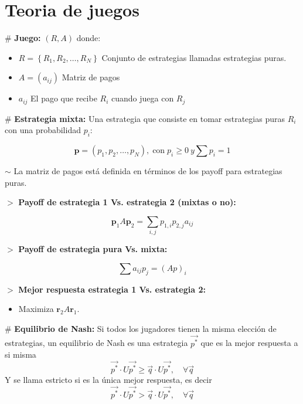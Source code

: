 \documentclass[%
 reprint,
 amsmath,amssymb,
 aps,
]{revtex4-1}
\begin{document}

\section{Teoria de juegos}

$\#$ \textbf{Juego:} $(R, A)$ donde:

\begin{itemize}
  \item[] 
  $R=\left\{R_{1}, R_{2}, \ldots, R_{N}\right\}$ Conjunto de estrategias llamadas estrategias puras. 
  \item[] 
  $A=\left(a_{i j}\right)$ Matriz de pagos
  \item[] 
  $a_{i j}$ El pago que recibe $R_i$ cuando juega con $R_j$
\end{itemize}

$\#$ \textbf{Estrategia mixta:} Una estrategia que consiste en tomar estrategias puras $R_i$ con una probabilidad $p_i$:

$$
\boldsymbol{p}=\left(p_{1}, p_{2}, \ldots, p_{N}\right), \operatorname{con} p_{i} \geq 0 \ y \sum p_{i}=1
$$

$\sim$ La matriz de pagos está definida en términos de los payoff para estrategias puras. 

$>$ \textbf{Payoff de estrategia 1 Vs. estrategia 2 (mixtas o no):}

$$
\mathbf{p}_{1} A \mathbf{p}_{2} = \sum_{i, j} p_{1,i} p_{2,j} a_{i j}
$$

$>$ \textbf{Payoff de estrategia pura Vs. mixta:}

$$
\sum a_{i j} p_{j}=(A p)_{i}
$$

$>$ \textbf{Mejor respuesta estrategia 1 Vs. estrategia 2:} 
\begin{itemize}
  \item[] Maximiza  $\mathbf{r}_{2} A \mathbf{r}_1$. 
\end{itemize}

$\#$ \textbf{Equilibrio de Nash:} Si todos los jugadores tienen la misma elección de estrategias, un equilibrio de Nash es una estrategia $\vec{p^{*}}$ que es la mejor respuesta a si misma
$$
\vec{p^{*}} \cdot U \vec{p^{*}} \geqslant \vec{q} \cdot U \vec{p^{*}}, \quad \forall \vec{q}
$$
Y se llama estricto si es la única mejor respuesta, es decir
$$
\vec{p^{*}} \cdot U \vec{p^{*}} > \vec{q} \cdot U \vec{p^{*}}, \quad \forall \vec{q}
$$
\end{document}
